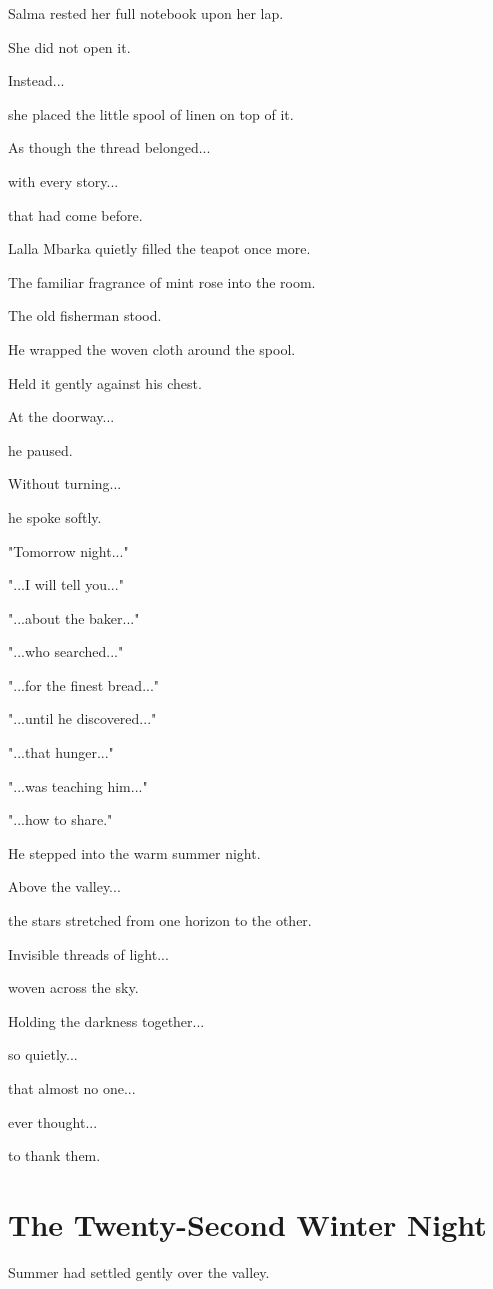 \documentclass[12pt,openany]{book}
\begin{document}
Salma rested her full notebook upon her lap.

She did not open it.

Instead...

she placed the little spool of linen on top of it.

As though the thread belonged...

with every story...

that had come before.

Lalla Mbarka quietly filled the teapot once more.

The familiar fragrance of mint rose into the room.

The old fisherman stood.

He wrapped the woven cloth around the spool.

Held it gently against his chest.

At the doorway...

he paused.

Without turning...

he spoke softly.

"Tomorrow night..."

"...I will tell you..."

"...about the baker..."

"...who searched..."

"...for the finest bread..."

"...until he discovered..."

"...that hunger..."

"...was teaching him..."

"...how to share."

He stepped into the warm summer night.

Above the valley...

the stars stretched from one horizon to the other.

Invisible threads of light...

woven across the sky.

Holding the darkness together...

so quietly...

that almost no one...

ever thought...

to thank them.
\chapter{The Twenty-Second Winter Night}

Summer had settled gently over the valley.
\end{document}
